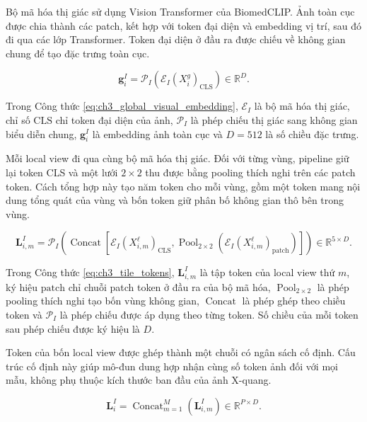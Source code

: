 Bộ mã hóa thị giác sử dụng Vision Transformer của BiomedCLIP. Ảnh toàn cục được chia thành các patch, kết hợp với token đại diện và embedding vị trí, sau đó đi qua các lớp Transformer. Token đại diện ở đầu ra được chiếu về không gian chung để tạo đặc trưng toàn cục.

\begin{equation}\boldsymbol{g}_i^{I}=\mathcal{P}_{I}\left(\mathcal{E}_{I}\left(X_i^{g}\right)_{\mathrm{CLS}}\right)\in\mathbb{R}^{D}.\label{eq:ch3_global_visual_embedding}\end{equation}

Trong Công thức \ref{eq:ch3_global_visual_embedding}, $\mathcal{E}_{I}$ là bộ mã hóa thị giác, chỉ số $\mathrm{CLS}$ chỉ token đại diện của ảnh, $\mathcal{P}_{I}$ là phép chiếu thị giác sang không gian biểu diễn chung, $\boldsymbol{g}_i^{I}$ là embedding ảnh toàn cục và $D=512$ là số chiều đặc trưng.

Mỗi local view đi qua cùng bộ mã hóa thị giác. Đối với từng vùng, pipeline giữ lại token CLS và một lưới $2\times2$ thu được bằng pooling thích nghi trên các patch token. Cách tổng hợp này tạo năm token cho mỗi vùng, gồm một token mang nội dung tổng quát của vùng và bốn token giữ phân bố không gian thô bên trong vùng.

\begin{equation}\boldsymbol{L}_{i,m}^{I}=\mathcal{P}_{I}\left(\operatorname{Concat}\left[\mathcal{E}_{I}\left(X_{i,m}^{\ell}\right)_{\mathrm{CLS}},\operatorname{Pool}_{2\times2}\left(\mathcal{E}_{I}\left(X_{i,m}^{\ell}\right)_{\mathrm{patch}}\right)\right]\right)\in\mathbb{R}^{5\times D}.\label{eq:ch3_tile_tokens}\end{equation}

Trong Công thức \ref{eq:ch3_tile_tokens}, $\boldsymbol{L}_{i,m}^{I}$ là tập token của local view thứ $m$, ký hiệu $\mathrm{patch}$ chỉ chuỗi patch token ở đầu ra của bộ mã hóa, $\operatorname{Pool}_{2\times2}$ là phép pooling thích nghi tạo bốn vùng không gian, $\operatorname{Concat}$ là phép ghép theo chiều token và $\mathcal{P}_{I}$ là phép chiếu được áp dụng theo từng token. Số chiều của mỗi token sau phép chiếu được ký hiệu là $D$.

Token của bốn local view được ghép thành một chuỗi có ngân sách cố định. Cấu trúc cố định này giúp mô-đun dung hợp nhận cùng số token ảnh đối với mọi mẫu, không phụ thuộc kích thước ban đầu của ảnh X-quang.

\begin{equation}\boldsymbol{L}_{i}^{I}=\operatorname{Concat}_{m=1}^{M}\left(\boldsymbol{L}_{i,m}^{I}\right)\in\mathbb{R}^{P\times D}.\label{eq:ch3_all_local_tokens}\end{equation}

